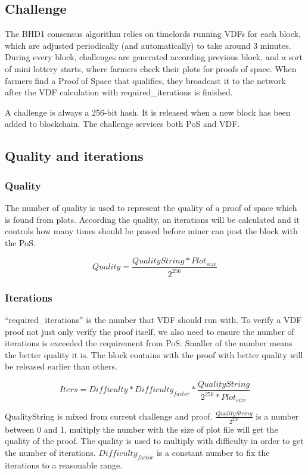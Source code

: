 \subsection{Challenge}
\begin{flushleft}
    The BHD1 consensus algorithm relies on timelords running VDFs for each block, which are adjusted periodically (and automatically) to take around 3 minutes. During every block, challenges are generated according previous block, and a sort of mini lottery starts, where farmers check their plots for proofs of space. When farmers find a Proof of Space that qualifies, they broadcast it to the network after the VDF calculation with required\_iterations is finished.
\end{flushleft}
\begin{flushleft}
    A challenge is always a 256-bit hash. It is released when a new block has been added to blockchain. The challenge services both PoS and VDF.
\end{flushleft}
\subsection{Quality and iterations}
\subsubsection{Quality}
\begin{flushleft}
    The number of quality is used to represent the quality of a proof of space which is found from plots. According the quality, an iterations will be calculated and it controls how many times should be passed before miner can post the block with the PoS.
\end{flushleft}
\begin{equation}
    Quality = \frac{QualityString * Plot_{size}}{2^{256}}
\end{equation}
\subsubsection{Iterations}
\begin{flushleft}
    ``required\_iterations'' is the number that VDF should run with. To verify a VDF proof not just only verify the proof itself, we also need to ensure the number of iterations is exceeded the requirement from PoS. Smaller of the number means the better quality it is. The block contains with the proof with better quality will be released earlier than others.
\end{flushleft}
\begin{equation}
    Iters = Difficulty * Difficulty_{factor} * \frac{QualityString}{2^{256} * Plot_{size}}
\end{equation}
\begin{flushleft}
    QualityString is mixed from current challenge and proof. $\frac{QualityString}{2^{256}}$ is a number between 0 and 1, multiply the number with the size of plot file will get the quality of the proof. The quality is used to multiply with difficulty in order to get the number of iterations. $Difficulty_{factor}$ is a constant number to fix the iterations to a reasonable range.
\end{flushleft}
